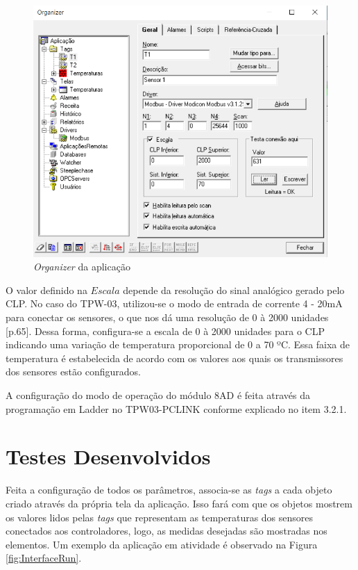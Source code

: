 \begin{figure}[h!]
\centering
\includegraphics[scale=0.7]{Organizer.png}
\caption{\textit{Organizer} da aplicação}
\label{fig:Organizer}
\end{figure}

O valor definido na $Escala$ depende da resolução do sinal analógico gerado pelo CLP. No caso do TPW-03, utilizou-se o modo de entrada de corrente 4 - 20mA para conectar os sensores, o que nos dá uma resolução de 0 à 2000 unidades \cite{weg2010manualinstalacao}[p.65]. Dessa forma, configura-se a escala de 0 à 2000 unidades para o CLP indicando uma variação de temperatura proporcional de 0 a 70 ºC. Essa faixa de temperatura é estabelecida de acordo com os valores aos quais os transmissores dos sensores estão configurados.

A configuração do modo de operação do módulo 8AD é feita através da programação em Ladder no TPW03-PCLINK conforme explicado no item 3.2.1.


\section{Testes Desenvolvidos}

Feita a configuração de todos os parâmetros, associa-se as \textit{tags} a cada objeto criado através da própria tela da aplicação. Isso fará com que os objetos mostrem os valores lidos pelas \textit{tags} que representam as temperaturas dos sensores conectados aos controladores, logo, as medidas desejadas são mostradas nos elementos. Um exemplo da aplicação em atividade é observado na Figura \ref{fig:InterfaceRun}.

